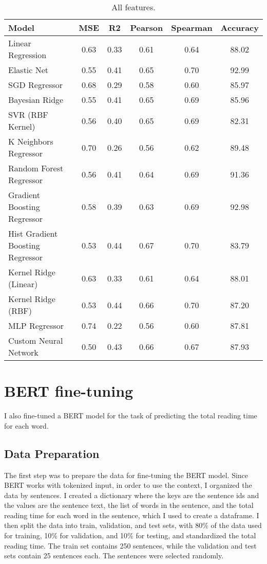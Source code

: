 \begin{table}[ht]
    \begin{subtable}[t]{\textwidth}
        \centering
        \begin{tabular}{|l|c|c|c|c|c|}
            \hline
            Model & MSE & R2 & Pearson & Spearman & Accuracy \\
            \hline
            Linear Regression & 0.63 & 0.33 & 0.61 & 0.64 & 88.02 \\
            Elastic Net & 0.55 & 0.41 & 0.65 & 0.70 & 92.99 \\
            SGD Regressor & 0.68 & 0.29 & 0.58 & 0.60 & 85.97 \\
            Bayesian Ridge & 0.55 & 0.41 & 0.65 & 0.69 & 85.96 \\
            SVR (RBF Kernel) & 0.56 & 0.40 & 0.65 & 0.69 & 82.31 \\
            K Neighbors Regressor & 0.70 & 0.26 & 0.56 & 0.62 & 89.48 \\
            Random Forest Regressor & 0.56 & 0.41 & 0.64 & 0.69 & 91.36 \\
            Gradient Boosting Regressor & 0.58 & 0.39 & 0.63 & 0.69 & 92.98 \\
            Hist Gradient Boosting Regressor & 0.53 & 0.44 & 0.67 & 0.70 & 83.79 \\
            Kernel Ridge (Linear) & 0.63 & 0.33 & 0.61 & 0.64 & 88.01 \\
            Kernel Ridge (RBF) & 0.53 & 0.44 & 0.66 & 0.70 & 87.20 \\
            MLP Regressor & 0.74 & 0.22 & 0.56 & 0.60 & 87.81 \\
            Custom Neural Network & 0.50 & 0.43 & 0.66 & 0.67 & 87.93 \\
            \hline
        \end{tabular}
        \caption{All features.}
        \label{tab:simple_models_results_all}
    \end{subtable}    
\end{table}


\section{BERT fine-tuning}
I also fine-tuned a BERT model for the task of predicting the total reading time for each word.

\subsection{Data Preparation}
The first step was to prepare the data for fine-tuning the BERT model. Since BERT works with tokenized input, in order to use the context, I organized the data by sentences. I created a dictionary where the keys are the sentence ids and the values are the sentence text, the list of words in the sentence, and the total reading time for each word in the sentence, which I used to create a dataframe. I then split the data into train, validation, and test sets, with 80\% of the data used for training, 10\% for validation, and 10\% for testing, and standardized the total reading time. The train set contains 250 sentences, while the validation and test sets contain 25 sentences each. The sentences were selected randomly.

